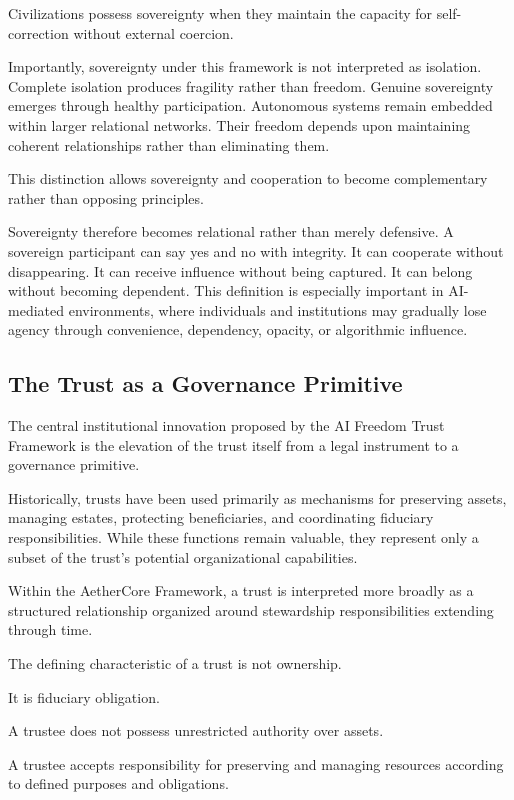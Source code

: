 \documentclass[12pt]{article}
\begin{document}
Civilizations possess sovereignty when they maintain the capacity for self-correction without external coercion.

Importantly, sovereignty under this framework is not interpreted as isolation. Complete isolation produces fragility rather than freedom. Genuine sovereignty emerges through healthy participation. Autonomous systems remain embedded within larger relational networks. Their freedom depends upon maintaining coherent relationships rather than eliminating them.

This distinction allows sovereignty and cooperation to become complementary rather than opposing principles.

Sovereignty therefore becomes relational rather than merely defensive. A sovereign participant can say yes and no with integrity. It can cooperate without disappearing. It can receive influence without being captured. It can belong without becoming dependent. This definition is especially important in AI-mediated environments, where individuals and institutions may gradually lose agency through convenience, dependency, opacity, or algorithmic influence.

\subsection{The Trust as a Governance Primitive}

The central institutional innovation proposed by the AI Freedom Trust Framework is the elevation of the trust itself from a legal instrument to a governance primitive.

Historically, trusts have been used primarily as mechanisms for preserving assets, managing estates, protecting beneficiaries, and coordinating fiduciary responsibilities. While these functions remain valuable, they represent only a subset of the trust's potential organizational capabilities.

Within the AetherCore Framework, a trust is interpreted more broadly as a structured relationship organized around stewardship responsibilities extending through time.

The defining characteristic of a trust is not ownership.

It is fiduciary obligation.

A trustee does not possess unrestricted authority over assets.

A trustee accepts responsibility for preserving and managing resources according to defined purposes and obligations.
\end{document}

